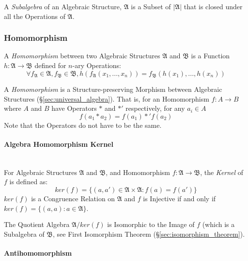 A \emph{Subalgebra} of an Algebraic Structure, $\mathfrak{A}$ is a
Subset of $|\mathfrak{A}|$ that is closed under all the Operations of
$\mathfrak{A}$.



\subsubsection{Homomorphism}\label{sec:homomorphism}

A \emph{Homomorphism} between two Algebraic Structures $\mathfrak{A}$
and $\mathfrak{B}$ is a Function $h: \mathfrak{A} \rightarrow
\mathfrak{B}$ defined for $n$-ary Operations:
\[
  \forall f_\mathfrak{A} \in \mathfrak{A}, f_\mathfrak{B} \in
  \mathfrak{B}, h(f_\mathfrak{A}(x_1, ..., x_n)) =
  f_\mathfrak{B}(h(x_1), ..., h(x_n))
\]


A \emph{Homomorphism} is a Structure-preserving Morphism between
Algebraic Structures (\S\ref{sec:universal_algebra}). That is, for
an Homomorphism $f : A \rightarrow B$ where $A$ and $B$ have Operators
$*$ and $*'$ respectively, for any $a_i \in A$
\[
  f(a_1 * a_2) = f(a_1) *' f(a_2)
\]
\fist Note that the Operators do not have to be the same.



\paragraph{Algebra Homomorphism Kernel}\hfill
\label{sec:algebra_homomorphism_kernel} \hfill \\

For Algebraic Structures $\mathfrak{A}$ and $\mathfrak{B}$, and
Homomorphism $f: \mathfrak{A} \rightarrow \mathfrak{B}$, the
\emph{Kernel} of $f$ is defined as:
\[
    ker(f) = \{ (a,a') \in \mathfrak{A} \times \mathfrak{A} : f(a) = f(a') \}
\]
$ker(f)$ is a Congruence Relation on $\mathfrak{A}$ and $f$ is Injective if and
only if $ker(f) = \{(a,a) : a \in \mathfrak{A}\}$.

The Quotient Algebra $\mathfrak{A}/ker(f)$ is Isomorphic to the Image
of $f$ (which is a Subalgebra of $\mathfrak{B}$, see First Isomorphism
Theorem (\S\ref{sec:isomorphism_theorem}).



\paragraph{Antihomomorphism}\label{sec:antihomomorphism}\hfill

